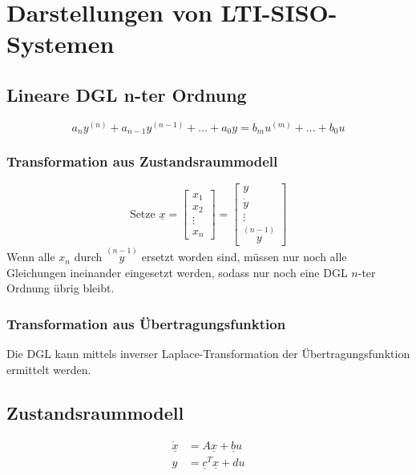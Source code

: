 \documentclass[a4paper,twocolumn,10pt]{article}
\begin{document}
\section{Darstellungen von LTI-SISO-Systemen}

\subsection{Lineare DGL n-ter Ordnung}
\begin{equation*}
a_ny^{(n)}+a_{n-1}y^{(n-1)}+...+a_0y=b_mu^{(m)}+...+b_0u
\end{equation*}

\subsubsection{Transformation aus Zustandsraummodell}
\begin{equation*}
\text{Setze }\underline{x}=\begin{bmatrix}x_1 \\ x_2 \\ \vdots \\ x_n\end{bmatrix}=\begin{bmatrix}y \\ \dot{y} \\ \vdots \\ \overset{(n-1)}{y}\end{bmatrix}
\end{equation*}
Wenn alle $x_n$ durch $\overset{(n-1)}{y}$ ersetzt worden sind, müssen nur noch alle Gleichungen ineinander eingesetzt werden, sodass nur noch eine DGL $n$-ter Ordnung übrig bleibt.

\subsubsection{Transformation aus Übertragungsfunktion}
Die DGL kann mittels inverser Laplace-Transformation der Übertragungsfunktion ermittelt werden.

\subsection{Zustandsraummodell}
\begin{equation*}
\begin{split}
\underline{\dot{x}}&=A\underline{x}+\underline{b}u\\
y&=\underline{c}^T\underline{x}+du
\end{split}
\end{equation*}
\end{document}
